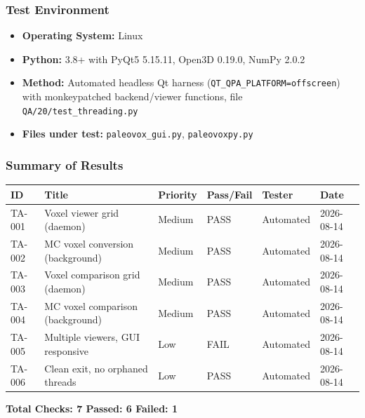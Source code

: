 \documentclass[12pt,a4paper]{article}
\begin{document}
\subsubsection{Test Environment}
\begin{itemize}
  \item \textbf{Operating System:} Linux
  \item \textbf{Python:} 3.8+ with PyQt5 5.15.11, Open3D 0.19.0, NumPy 2.0.2
  \item \textbf{Method:} Automated headless Qt harness
    (\texttt{QT\_QPA\_PLATFORM=offscreen}) with monkeypatched backend/viewer
    functions, file \texttt{QA/20/test\_threading.py}
  \item \textbf{Files under test:} \texttt{paleovox\_gui.py},
    \texttt{paleovoxpy.py}
\end{itemize}

\subsubsection{Summary of Results}
\begin{longtable}{p{1.2cm}p{5.5cm}p{1.5cm}p{1.5cm}p{1.5cm}p{2cm}}
\toprule
\textbf{ID} & \textbf{Title} & \textbf{Priority} & \textbf{Pass/Fail} & \textbf{Tester} & \textbf{Date} \\
\midrule
TA-001 & Voxel viewer grid (daemon)        & Medium & PASS & Automated & 2026-08-14 \\
TA-002 & MC voxel conversion (background)  & Medium & PASS & Automated & 2026-08-14 \\
TA-003 & Voxel comparison grid (daemon)    & Medium & PASS & Automated & 2026-08-14 \\
TA-004 & MC voxel comparison (background)  & Medium & PASS & Automated & 2026-08-14 \\
TA-005 & Multiple viewers, GUI responsive  & Low    & FAIL & Automated & 2026-08-14 \\
TA-006 & Clean exit, no orphaned threads   & Low    & PASS & Automated & 2026-08-14 \\
\bottomrule
\end{longtable}

\begin{center}
\large\textbf{Total Checks: 7 \hspace{1em} Passed: 6 \hspace{1em} Failed: 1}
\end{center}

\newpage

\end{document}

